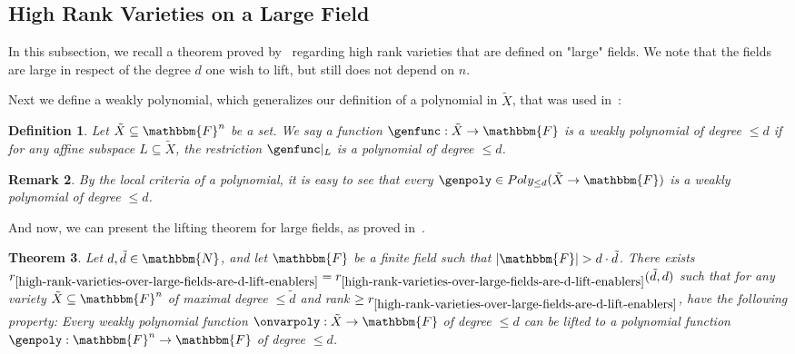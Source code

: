 \documentclass[10pt,a4paper]{article}
\newtheorem{theorem}{Theorem}[section]
\newtheorem{definition}[theorem]{Definition}
\newtheorem{remark}[theorem]{Remark}
\newcommand{\basefield}[0]{\mathbbm{F}}
\newcommand{\blocklength}[0]{n}
\newcommand{\field}[0]{\basefield^{\blocklength}}
\newcommand{\degree}[0]{d}
\newcommand{\funcdef}[3]{#1:#2\rightarrow#3}
\newcommand{\restrictfunc}[2]{#1|_{#2}}
\newcommand{\allpolyset}[3]{Poly_{#1}(#2\rightarrow#3)}
\newcommand{\naturalnumbersset}[0]{\mathbbm{N}}
\newcommand{\variety}{{\tilde{X}}}
\newcommand{\varietydeg}[0]{\tilde{\degree}}
\newcommand{\rankfunc}[0]{{{{r}}}}
\newcommand{\abs}[1]{\left| #1 \right|}
\begin{document}
\subsection[High Rank Varieties on a Large Field]{High Rank Varieties on a Large Field}\label{subsec:high-rank-varieties-on-a-large-field}
In this subsection, we recall a theorem proved by~\cite[Theorem 1.7]{kazhdan2019extendingweaklypolynomialfunctions} regarding high rank varieties that are defined on "large" fields.
We note that the fields are large in respect of the degree $\degree$ one wish to lift, but still does not depend on $\blocklength$.

Next we define a weakly polynomial, which generalizes our definition of a polynomial in $\variety$, that was used in~\cite[Definition 1.1]{kazhdan2019extendingweaklypolynomialfunctions}:
\begin{definition}
    Let $\variety \subseteq \field$ be a set.
    We say a function $\funcdef{\genfunc}{\variety}{\basefield}$ is a \emph{weakly polynomial of degree $\leq \degree$}
    if for any affine subspace $L \subseteq \variety$, the restriction $\restrictfunc{\genfunc}{L}$ is a polynomial of degree $\leq \degree$.
\end{definition}
\begin{remark}
    By the local criteria of a polynomial, it is easy to see that every $\genpoly \in \allpolyset{\leq \degree}{\variety}{\basefield}$ is a weakly polynomial of degree $\leq \degree$.
\end{remark}
And now, we can present the lifting theorem for large fields, as proved in~\cite[Theorem 2.17]{kazhdan2020propertieshighranksubvarieties}.
\begin{theorem}\label{high-rank-varieties-over-large-fields-are-d-lift-enablers}\cite[Theorem 2.17]{kazhdan2020propertieshighranksubvarieties}
    Let $\degree, \varietydeg \in \naturalnumbersset$,
    and let $\basefield$ be a finite field such that $\abs{\basefield} > \degree \cdot \varietydeg$.
    There exists $\rankfunc_{\ref{high-rank-varieties-over-large-fields-are-d-lift-enablers}} = \rankfunc_{\ref{high-rank-varieties-over-large-fields-are-d-lift-enablers}}(\varietydeg, \degree)$
    such that for any variety $\variety \subseteq \field$ of maximal degree $\leq \varietydeg$ and rank $\geq \rankfunc_{\ref{high-rank-varieties-over-large-fields-are-d-lift-enablers}}$,
    have the following property:
    Every weakly polynomial function $\funcdef{\onvarpoly }{\variety}{\basefield}$ of degree $\leq \degree$
    can be lifted to a polynomial function $\funcdef{\genpoly}{\field}{\basefield}$ of degree $\leq \degree$.
\end{theorem}
\end{document}
